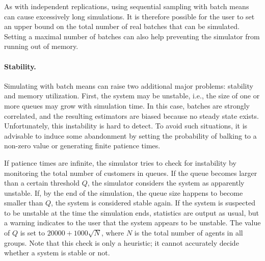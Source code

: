 As with independent replications, using sequential sampling with batch
means can cause excessively long simulations.  It is therefore possible for
the user to
set an upper bound on the total number of real batches that can be
simulated.  Setting a maximal number of batches can also help
preventing the simulator from running out of memory.

\paragraph{Stability.}
Simulating with batch means can raise two additional major problems:
stability and memory utilization.
First, the
system may be unstable, i.e., the size of one or more queues may grow
with simulation time.  In this case, batches are strongly correlated,
and the resulting estimators are biased because no steady state
exists.  Unfortunately,
this instability is hard to detect.  To avoid such situations, it is
advisable to induce some abandonment by setting the probability of
balking to a non-zero value or generating finite patience times.

If patience times are infinite, the simulator tries to check for
instability by monitoring the total
number of customers in queues.  If the queue becomes larger than a
certain threshold $Q$, the simulator considers the system as
apparently unstable.  If, by the end of the simulation, the queue size
happens to become smaller than $Q$, the system is considered stable
again.  If the system is suspected to be unstable at the
time the simulation ends, statistics are output as usual, but a warning
indicates to the user that the system appears to be unstable.
The value of $Q$ is set to $20000 + 1000\sqrt{N}$, where $N$ is the
total number of agents in all groups.
Note that this check is only a heuristic; it cannot accurately
decide whether a system is stable or not.

